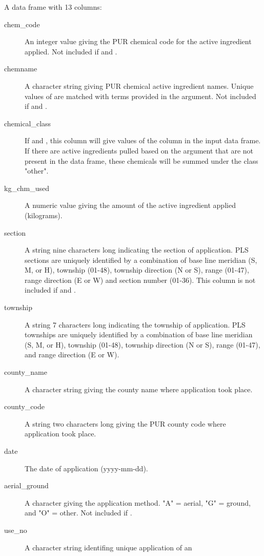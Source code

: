 \documentclass[a4paper]{book}
\begin{document}
\begin{Value}
A data frame with 13 columns:
\begin{description}

\item[chem\_code] An integer value giving the PUR chemical code
for the active ingredient applied. Not included if
 and .
\item[chemname] A character string giving PUR chemical active
ingredient names. Unique values of  are matched with terms
provided in the  argument. Not included
if  and .
\item[chemical\_class] If  and
, this column will give values of the
 column in the input  data frame.
If there are active ingredients pulled based on the
 argument that are not present in the 
data frame, these chemicals will be summed under the class "other".
\item[kg\_chm\_used] A numeric value giving the amount of the active
ingredient applied (kilograms).
\item[section] A string nine characters long indicating the section
of application. PLS sections are uniquely identified by a combination of
base line meridian (S, M, or H), township (01-48), township direction
(N or S), range (01-47), range direction (E or W) and section number
(01-36). This column is not included if
 and .
\item[township] A string 7 characters long indicating the township
of application. PLS townships are uniquely identified by a combination of
base line meridian (S, M, or H), township (01-48), township direction
(N or S), range (01-47), and range direction (E or W).
\item[county\_name] A character string giving the county name where
application took place.
\item[county\_code] A string two characters long giving the PUR county
code where application took place.
\item[date] The date of application (yyyy-mm-dd).
\item[aerial\_ground] A character giving the application method.
"A" = aerial, "G" = ground, and "O" = other. Not included
if .
\item[use\_no] A character string identifing unique application of an

\end{description}
\end{Value}
\end{document}
